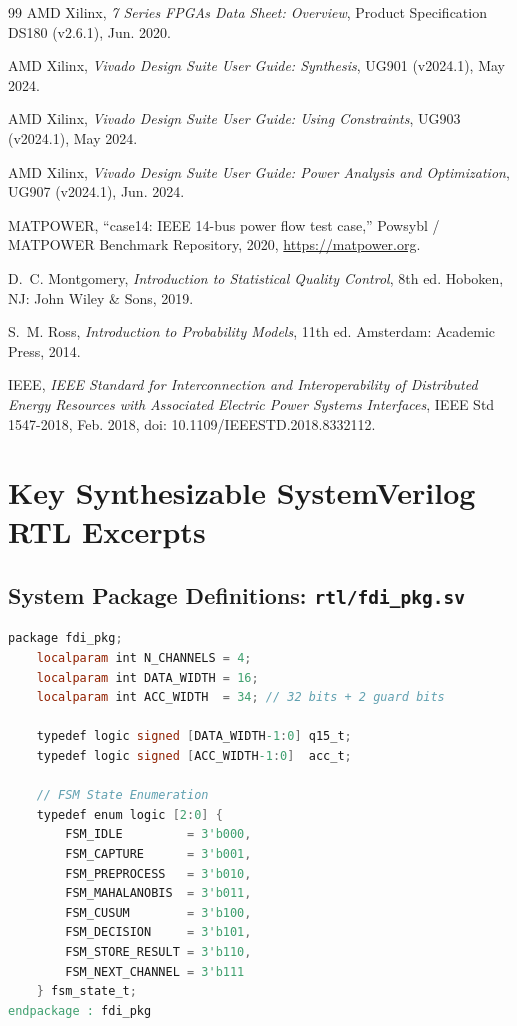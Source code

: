 \documentclass[12pt,a4paper]{report}
\begin{document}
\begin{thebibliography}{99}
AMD Xilinx,
\textit{7 Series FPGAs Data Sheet: Overview},
Product Specification DS180 (v2.6.1), Jun. 2020.

AMD Xilinx,
\textit{Vivado Design Suite User Guide: Synthesis},
UG901 (v2024.1), May 2024.

AMD Xilinx,
\textit{Vivado Design Suite User Guide: Using Constraints},
UG903 (v2024.1), May 2024.

AMD Xilinx,
\textit{Vivado Design Suite User Guide: Power Analysis and Optimization},
UG907 (v2024.1), Jun. 2024.

MATPOWER,
``case14: IEEE 14-bus power flow test case,''
Powsybl / MATPOWER Benchmark Repository, 2020, \url{https://matpower.org}.

D.~C. Montgomery,
\textit{Introduction to Statistical Quality Control},
8th ed. Hoboken, NJ: John Wiley \& Sons, 2019.

S.~M. Ross,
\textit{Introduction to Probability Models},
11th ed. Amsterdam: Academic Press, 2014.

IEEE,
\textit{IEEE Standard for Interconnection and Interoperability of Distributed Energy Resources with Associated Electric Power Systems Interfaces},
IEEE Std 1547-2018, Feb. 2018, doi: 10.1109/IEEESTD.2018.8332112.

\end{thebibliography}

\appendix

\chapter{Key Synthesizable SystemVerilog RTL Excerpts}

\section{System Package Definitions: \texttt{rtl/fdi\_pkg.sv}}
\begin{lstlisting}[language=Verilog,caption={Package definitions and arithmetic parameters.}]
package fdi_pkg;
    localparam int N_CHANNELS = 4;
    localparam int DATA_WIDTH = 16;
    localparam int ACC_WIDTH  = 34; // 32 bits + 2 guard bits

    typedef logic signed [DATA_WIDTH-1:0] q15_t;
    typedef logic signed [ACC_WIDTH-1:0]  acc_t;

    // FSM State Enumeration
    typedef enum logic [2:0] {
        FSM_IDLE         = 3'b000,
        FSM_CAPTURE      = 3'b001,
        FSM_PREPROCESS   = 3'b010,
        FSM_MAHALANOBIS  = 3'b011,
        FSM_CUSUM        = 3'b100,
        FSM_DECISION     = 3'b101,
        FSM_STORE_RESULT = 3'b110,
        FSM_NEXT_CHANNEL = 3'b111
    } fsm_state_t;
endpackage : fdi_pkg
\end{lstlisting}
\end{document}
